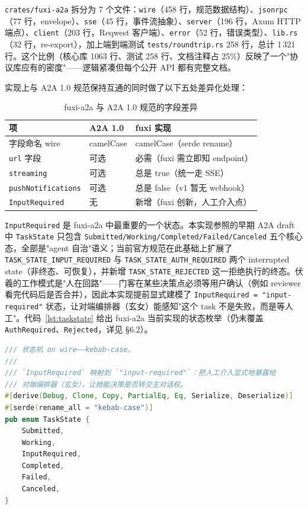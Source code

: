 \texttt{crates/fuxi-a2a} 拆分为 7 个文件：\texttt{wire}（458 行，规范数据结构）、\texttt{jsonrpc}（77 行，envelope）、\texttt{sse}（45 行，事件流抽象）、\texttt{server}（196 行，Axum HTTP 端点）、\texttt{client}（203 行，Reqwest 客户端）、\texttt{error}（52 行，错误类型）、\texttt{lib.rs}（32 行，re-export），加上端到端测试 \texttt{tests/roundtrip.rs} 258 行，总计 1\,321 行。这个比例（核心库 1063 行、测试 258 行、文档注释占 25\%）反映了一个"协议库应有的密度"——逻辑紧凑但每个公开 API 都有完整文档。

实现上与 A2A 1.0 规范保持互通的同时做了以下五处差异化处理：

\begin{table}[H]
\centering
\caption{fuxi-a2a 与 A2A 1.0 规范的字段差异}
\label{tab:a2a-diff}
\begin{tabular}{lll}
\toprule
\textbf{项} & \textbf{A2A 1.0} & \textbf{fuxi 实现} \\
\midrule
字段命名 wire & camelCase & camelCase（serde rename） \\
\texttt{url} 字段 & 可选 & 必需（fuxi 需立即知 endpoint） \\
\texttt{streaming} & 可选 & 总是 true（统一走 SSE） \\
\texttt{pushNotifications} & 可选 & 总是 false（v1 暂无 webhook） \\
\texttt{InputRequired} & 无 & 新增（fuxi 创新，人工介入点） \\
\bottomrule
\end{tabular}
\end{table}

\texttt{InputRequired} 是 fuxi-a2a 中最重要的一个状态。本实现参照的早期 A2A draft 中 \texttt{TaskState} 只包含 \texttt{Submitted/Working/Completed/Failed/Canceled} 五个核心态，全部是"agent 自治"语义；当前官方规范在此基础上扩展了 \texttt{TASK\_STATE\_INPUT\_REQUIRED} 与 \texttt{TASK\_STATE\_AUTH\_REQUIRED} 两个 interrupted state（非终态、可恢复），并新增 \texttt{TASK\_STATE\_REJECTED} 这一拒绝执行的终态。伏羲的工作模式是"人在回路"——门客在某些决策点必须等用户确认（例如 reviewer 看完代码后是否合并），因此本实现提前显式建模了 \texttt{InputRequired = "input-required"} 状态，让对端编排器（玄女）能感知"这个 task 不是失败，而是等人工"。代码~\ref{lst:taskstate} 给出 fuxi-a2a 当前实现的状态枚举（仍未覆盖 \texttt{AuthRequired}、\texttt{Rejected}，详见 §6.2）。

\begin{lstlisting}[language=Rust, caption={TaskState wire 形态（fuxi-a2a/src/wire.rs）}, label={lst:taskstate}]
/// 状态机 on wire——kebab-case。
///
/// `InputRequired` 映射到 `"input-required"`：把人工介入显式地暴露给
/// 对端编排器（玄女），让她能决策是否转交主对话权。
#[derive(Debug, Clone, Copy, PartialEq, Eq, Serialize, Deserialize)]
#[serde(rename_all = "kebab-case")]
pub enum TaskState {
    Submitted,
    Working,
    InputRequired,
    Completed,
    Failed,
    Canceled,
}
\end{lstlisting}

